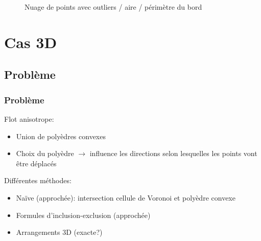 \documentclass{beamer}
\begin{document}
\begin{frame}
\begin{figure}
        \caption{Nuage de points avec outliers / aire / périmètre du bord}
    \end{figure}
\end{frame}

\section{Cas 3D}

\subsection{Problème}
\begin{frame}
    \frametitle{Problème}

    Flot anisotrope:
    \begin{itemize}
        \item Union de polyèdres convexes
        \item Choix du polyèdre $ \to $ influence les directions selon
            lesquelles les points vont être déplacés
    \end{itemize}

    Différentes méthodes:
    \begin{itemize}
        \item Naïve (approchée): intersection cellule de Voronoi et polyèdre
            convexe
        \item Formules d'inclusion-exclusion (approchée)
        \item Arrangements 3D (exacte?)
    \end{itemize}
\end{frame}
\end{document}

